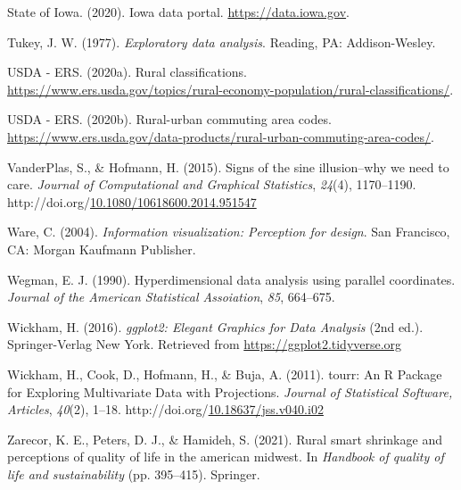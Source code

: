 \documentclass[print]{nuthesis}
\newlength{\cslhangindent}
\newenvironment{CSLReferences}[2]%
{\setlength{\parindent}{0pt}%
\everypar{\setlength{\hangindent}{\cslhangindent}}\ignorespaces}%
{\par}
\begin{document}
\begin{CSLReferences}{1}{0}
\leavevmode\hypertarget{ref-iowa_gov}{}%
State of Iowa. (2020). Iowa data portal. \url{https://data.iowa.gov}.

\leavevmode\hypertarget{ref-Tukey}{}%
Tukey, J. W. (1977). \emph{Exploratory data analysis}. Reading, PA: Addison-Wesley.

\leavevmode\hypertarget{ref-Rural_classification}{}%
USDA - ERS. (2020a). Rural classifications. \url{https://www.ers.usda.gov/topics/rural-economy-population/rural-classifications/}.

\leavevmode\hypertarget{ref-usda}{}%
USDA - ERS. (2020b). Rural-urban commuting area codes. \url{https://www.ers.usda.gov/data-products/rural-urban-commuting-area-codes/}.

\leavevmode\hypertarget{ref-sineillusion}{}%
VanderPlas, S., \& Hofmann, H. (2015). Signs of the sine illusion--why we need to care. \emph{Journal of Computational and Graphical Statistics}, \emph{24}(4), 1170--1190. http://doi.org/\href{https://doi.org/10.1080/10618600.2014.951547}{10.1080/10618600.2014.951547}

\leavevmode\hypertarget{ref-Ware2004}{}%
Ware, C. (2004). \emph{Information visualization: Perception for design}. San Francisco, CA: Morgan Kaufmann Publisher.

\leavevmode\hypertarget{ref-Wegman:1990}{}%
Wegman, E. J. (1990). {Hyperdimensional data analysis using parallel coordinates}. \emph{Journal of the American Statistical Assoiation}, \emph{85}, 664--675.

\leavevmode\hypertarget{ref-ggplot2}{}%
Wickham, H. (2016). \emph{{ggplot2: Elegant Graphics for Data Analysis}} (2nd ed.). Springer-Verlag New York. Retrieved from \url{https://ggplot2.tidyverse.org}

\leavevmode\hypertarget{ref-tourr}{}%
Wickham, H., Cook, D., Hofmann, H., \& Buja, A. (2011). {tourr: An R Package for Exploring Multivariate Data with Projections}. \emph{Journal of Statistical Software, Articles}, \emph{40}(2), 1--18. http://doi.org/\href{https://doi.org/10.18637/jss.v040.i02}{10.18637/jss.v040.i02}

\leavevmode\hypertarget{ref-zarecor2021rural}{}%
Zarecor, K. E., Peters, D. J., \& Hamideh, S. (2021). Rural smart shrinkage and perceptions of quality of life in the american midwest. In \emph{Handbook of quality of life and sustainability} (pp. 395--415). Springer.

\end{CSLReferences}


\backmatter
\end{document}
